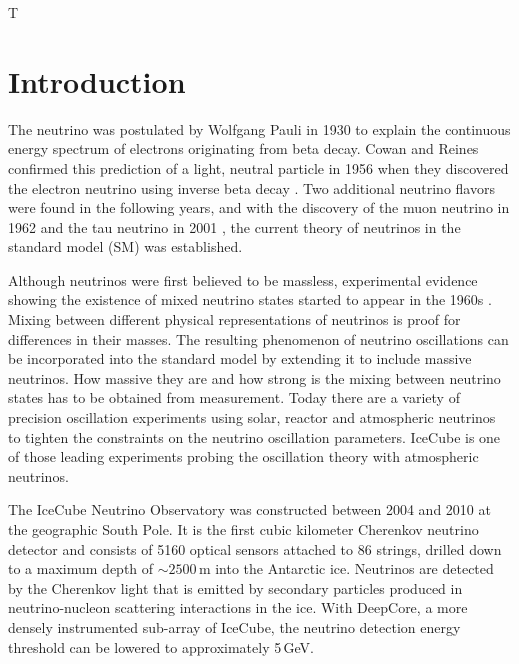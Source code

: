 T\chapter{Introduction}

The neutrino was postulated by Wolfgang Pauli \cite{Pauli:1930pc} in 1930 to explain the continuous energy spectrum of electrons originating from beta decay.
Cowan and Reines confirmed this prediction of a light, neutral particle in 1956 when they discovered the electron neutrino using inverse beta decay \cite{Cowan103}.
Two additional neutrino flavors were found in the following years, and with the discovery of the muon neutrino in 1962 \cite{PhysRevLett.9.36} and the tau neutrino in 2001 \cite{KODAMA2001218}, the current theory of neutrinos in the standard model (SM) was established.

Although neutrinos were first believed to be massless, experimental evidence showing the existence of mixed neutrino states started to appear in the 1960s \cite{homestake}.
Mixing between different physical representations of neutrinos is proof for differences in their masses.
The resulting phenomenon of neutrino oscillations can be incorporated into the standard model by extending it to include massive neutrinos.
How massive they are and how strong is the mixing between neutrino states has to be obtained from measurement.
Today there are a variety of precision oscillation experiments using solar, reactor and atmospheric neutrinos to tighten the constraints on the neutrino oscillation parameters.
IceCube is one of those leading experiments probing the oscillation theory with atmospheric neutrinos.

The IceCube Neutrino Observatory \cite{2017JInst..12P3012A_Instrumentation_Systems} was constructed between 2004 and 2010 at the geographic South Pole.
It is the first cubic kilometer Cherenkov neutrino detector and consists of 5160 optical sensors attached to 86 strings, drilled down to a maximum depth of $\sim2500$\,m into the Antarctic ice.
Neutrinos are detected by the Cherenkov light that is emitted by secondary particles produced in neutrino-nucleon scattering interactions in the ice.
With DeepCore, a more densely instrumented sub-array of IceCube, the neutrino detection energy threshold can be lowered to approximately 5\,GeV.

